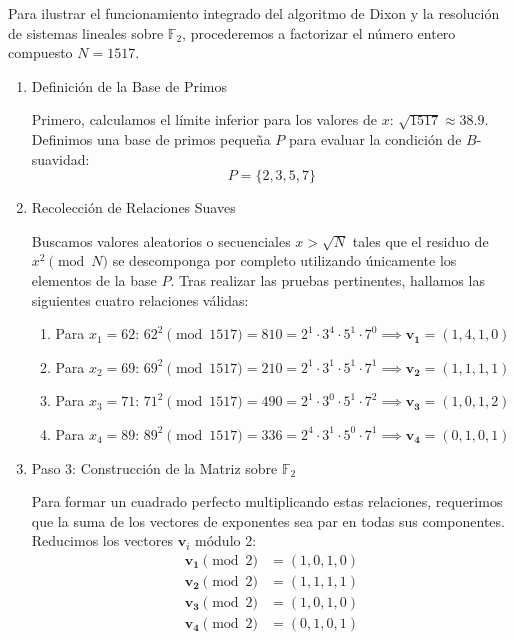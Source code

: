 \begin{ejemplo}

Para ilustrar el funcionamiento integrado del algoritmo de Dixon y la resolución de sistemas lineales sobre $\mathbb{F}_2$, procederemos a factorizar el número entero compuesto \textbf{$N = 1517$}.
\begin{enumerate}
\item Definición de la Base de Primos

Primero, calculamos el límite inferior para los valores de $x$: $\sqrt{1517} \approx 38.9$. Definimos una base de primos pequeña $P$ para evaluar la condición de $B$-suavidad:
\[
P = \{2, 3, 5, 7\}
\]

\item Recolección de Relaciones Suaves

Buscamos valores aleatorios o secuenciales $x > \sqrt{N}$ tales que el residuo de $x^2 \pmod{N}$ se descomponga por completo utilizando únicamente los elementos de la base $P$. Tras realizar las pruebas pertinentes, hallamos las siguientes cuatro relaciones válidas:
\begin{enumerate}
    \item Para $x_1 = 62$: \quad $62^2 \pmod{1517} = 810 = 2^1 \cdot 3^4 \cdot 5^1 \cdot 7^0 \implies \mathbf{v_1} = (1, 4, 1, 0)$
    \item Para $x_2 = 69$: \quad $69^2 \pmod{1517} = 210 = 2^1 \cdot 3^1 \cdot 5^1 \cdot 7^1 \implies \mathbf{v_2} = (1, 1, 1, 1)$
    \item Para $x_3 = 71$: \quad $71^2 \pmod{1517} = 490 = 2^1 \cdot 3^0 \cdot 5^1 \cdot 7^2 \implies \mathbf{v_3} = (1, 0, 1, 2)$
    \item Para $x_4 = 89$: \quad $89^2 \pmod{1517} = 336 = 2^4 \cdot 3^1 \cdot 5^0 \cdot 7^1 \implies \mathbf{v_4} = (0, 1, 0, 1)$
\end{enumerate}

\item Paso 3: Construcción de la Matriz sobre $\mathbb{F}_2$

Para formar un cuadrado perfecto multiplicando estas relaciones, requerimos que la suma de los vectores de exponentes sea par en todas sus componentes. Reducimos los vectores $\mathbf{v}_i$ módulo 2:
\begin{align*}
    \mathbf{v_1} \pmod 2 &= (1, 0, 1, 0) \\
    \mathbf{v_2} \pmod 2 &= (1, 1, 1, 1) \\
    \mathbf{v_3} \pmod 2 &= (1, 0, 1, 0) \\
    \mathbf{v_4} \pmod 2 &= (0, 1, 0, 1)
\end{align*}


\end{enumerate}
\end{ejemplo}
